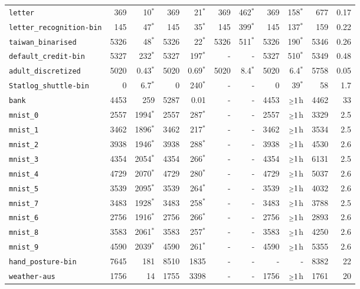 \begin{tabular}{lrrrrrrrrrr}
\texttt{letter} & 369 & 10$^*$ & 369 & 21$^*$ & 369 & 462$^*$ & 369 & 158$^*$ & 677 & 0.17\\
\texttt{letter\_recognition-bin} & 145 & 47$^*$ & 145 & 35$^*$ & 145 & 399$^*$ & 145 & 137$^*$ & 159 & 0.22\\
\texttt{taiwan\_binarised} & 5326 & 48$^*$ & 5326 & 22$^*$ & 5326 & 511$^*$ & 5326 & 190$^*$ & 5346 & 0.26\\
\texttt{default\_credit-bin} & 5327 & 232$^*$ & 5327 & 197$^*$ & - & - & 5327 & 510$^*$ & 5349 & 0.48\\
\texttt{adult\_discretized} & 5020 & 0.43$^*$ & 5020 & 0.69$^*$ & 5020 & 8.4$^*$ & 5020 & 6.4$^*$ & 5758 & 0.05\\
\texttt{Statlog\_shuttle-bin} & 0 & 6.7$^*$ & 0 & 240$^*$ & - & - & 0 & 39$^*$ & 58 & 1.7\\
\texttt{bank} & 4453 & 259 & 5287 & 0.01 & - & - & 4453 & $\mathsmaller{\geq}1$h & 4462 & 33\\
\texttt{mnist\_0} & 2557 & 1994$^*$ & 2557 & 287$^*$ & - & - & 2557 & $\mathsmaller{\geq}1$h & 3329 & 2.5\\
\texttt{mnist\_1} & 3462 & 1896$^*$ & 3462 & 217$^*$ & - & - & 3462 & $\mathsmaller{\geq}1$h & 3534 & 2.5\\
\texttt{mnist\_2} & 3938 & 1946$^*$ & 3938 & 288$^*$ & - & - & 3938 & $\mathsmaller{\geq}1$h & 4530 & 2.6\\
\texttt{mnist\_3} & 4354 & 2054$^*$ & 4354 & 266$^*$ & - & - & 4354 & $\mathsmaller{\geq}1$h & 6131 & 2.5\\
\texttt{mnist\_4} & 4729 & 2070$^*$ & 4729 & 280$^*$ & - & - & 4729 & $\mathsmaller{\geq}1$h & 5037 & 2.6\\
\texttt{mnist\_5} & 3539 & 2095$^*$ & 3539 & 264$^*$ & - & - & 3539 & $\mathsmaller{\geq}1$h & 4032 & 2.6\\
\texttt{mnist\_7} & 3483 & 1928$^*$ & 3483 & 258$^*$ & - & - & 3483 & $\mathsmaller{\geq}1$h & 3788 & 2.5\\
\texttt{mnist\_6} & 2756 & 1916$^*$ & 2756 & 266$^*$ & - & - & 2756 & $\mathsmaller{\geq}1$h & 2893 & 2.6\\
\texttt{mnist\_8} & 3583 & 2061$^*$ & 3583 & 257$^*$ & - & - & 3583 & $\mathsmaller{\geq}1$h & 4250 & 2.6\\
\texttt{mnist\_9} & 4590 & 2039$^*$ & 4590 & 261$^*$ & - & - & 4590 & $\mathsmaller{\geq}1$h & 5355 & 2.6\\
\texttt{hand\_posture-bin} & 7645 & 181 & 8510 & 1835 & - & - & - & - & 8382 & 22\\
\texttt{weather-aus} & 1756 & 14 & 1755 & 3398 & - & - & 1756 & $\mathsmaller{\geq}1$h & 1761 & 20\\
\bottomrule
\end{tabular}
